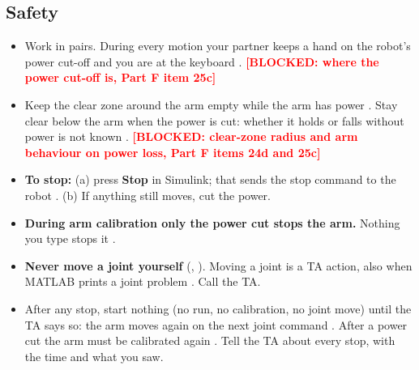 \documentclass[10pt]{article}
\newcommand{\todo}[1]{\textcolor{red}{\textbf{[#1]}}}
\newcommand{\cmd}[1]{\texttt{\romecode{#1}}}
\newif\ifshowsrc
\newcommand{\src}[1]{\ifshowsrc{\scriptsize\,[\texttt{\romecode{#1}}]}\else\unskip\fi}
\begin{document}
\subsection*{Safety}
\begin{itemize}[leftmargin=*, itemsep=1pt, topsep=1pt]
  \item Work in pairs. During every motion your partner keeps a hand on the robot's power cut-off and you are at the
  keyboard \src{docs/lab/PART_F_BENCH_CHECKLIST.md:18}.
  \todo{BLOCKED: where the power cut-off is, Part F item 25c}
  \item Keep the clear zone around the arm empty while the arm has power
  \src{docs/lab/PART_F_BENCH_CHECKLIST.md:20}. Stay clear below the arm when the power is cut: whether it holds or
  falls without power is not known \src{docs/lab/PART_F_BENCH_CHECKLIST.md:21}.
  \todo{BLOCKED: clear-zone radius and arm behaviour on power loss, Part F items 24d and 25c}
  \item \textbf{To stop:} (a) press \textbf{Stop} in Simulink; that sends the stop command to the robot
  \src{ROMECommand.m:197-200}. (b) If anything still moves, cut the power.
  \item \textbf{During arm calibration only the power cut stops the arm.} Nothing you type stops it
  \src{UK-Arduino/ROME_Teensy_Code/ROME_Teensy_Code.ino:160-163}.
  \item \textbf{Never move a joint yourself} (\cmd{jog_joint}, \cmd{jogROMEArm}). Moving a joint is a TA action, also
  when MATLAB prints a joint problem \src{calibrateROMEArm.m:193}. Call the TA.
  \item After any stop, start nothing (no run, no calibration, no joint move) until the TA says so: the arm moves
  again on the next joint command \src{UK-Arduino/ROME_Teensy_Code/ROME_Teensy_Code.ino:181-188}. After a power cut
  the arm must be calibrated again \src{UK-Arduino/ROME_Teensy_Code/ROME_Teensy_Code.ino:52}. Tell the TA about every
  stop, with the time and what you saw.
\end{itemize}
\end{document}
